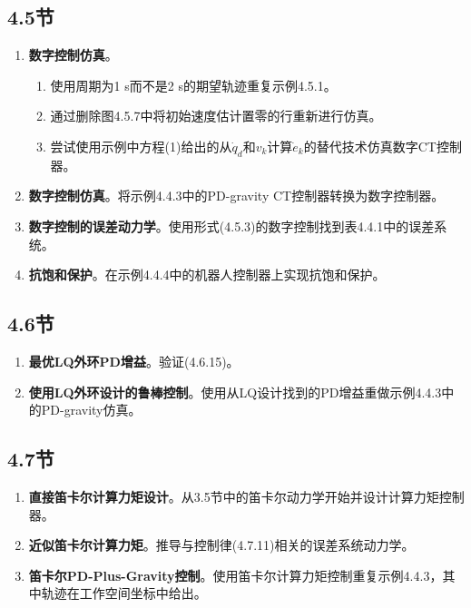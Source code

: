 \documentclass[UTF8]{ctexart}
\theoremstyle{definition}
\begin{document}
\subsection*{4.5节}
\begin{enumerate}[label=4.5--\arabic*, resume]
\item \textbf{数字控制仿真}。
\begin{enumerate}[label=(\alph*)]
\item 使用周期为1 s而不是2 s的期望轨迹重复示例4.5.1。
\item 通过删除图4.5.7中将初始速度估计置零的行重新进行仿真。
\item 尝试使用示例中方程(1)给出的从$\dot{q}_d$和$v_k$计算$\dot{e}_k$的替代技术仿真数字CT控制器。
\end{enumerate}

\item \textbf{数字控制仿真}。将示例4.4.3中的PD-gravity CT控制器转换为数字控制器。

\item \textbf{数字控制的误差动力学}。使用形式(4.5.3)的数字控制找到表4.4.1中的误差系统。

\item \textbf{抗饱和保护}。在示例4.4.4中的机器人控制器上实现抗饱和保护。
\end{enumerate}

\subsection*{4.6节}
\begin{enumerate}[label=4.6--\arabic*, resume]
\item \textbf{最优LQ外环PD增益}。验证(4.6.15)。

\item \textbf{使用LQ外环设计的鲁棒控制}。使用从LQ设计找到的PD增益重做示例4.4.3中的PD-gravity仿真。
\end{enumerate}

\subsection*{4.7节}
\begin{enumerate}[label=4.7--\arabic*, resume]
\item \textbf{直接笛卡尔计算力矩设计}。从3.5节中的笛卡尔动力学开始并设计计算力矩控制器。

\item \textbf{近似笛卡尔计算力矩}。推导与控制律(4.7.11)相关的误差系统动力学。

\item \textbf{笛卡尔PD-Plus-Gravity控制}。使用笛卡尔计算力矩控制重复示例4.4.3，其中轨迹在工作空间坐标中给出。
\end{enumerate}

\ifstandalone
  
\end{document}
